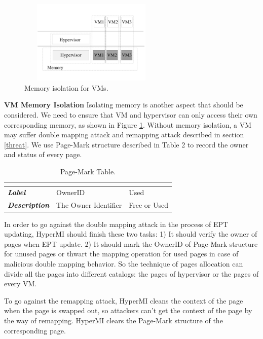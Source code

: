 \documentclass[conference]{IEEEtran}
\begin{document}
\begin{figure}
\centerline{\includegraphics[width=7cm, height=4cm]{pdfvmcs3.pdf}}%
\caption{Memory isolation for VMs.} \label{fig3}
\end{figure}


\textbf{VM Memory Isolation}
Isolating memory is another aspect that should be considered. We need to ensure that VM and hypervisor can only access their own corresponding memory, as shown in Figure \ref{fig3}.
Without memory isolation, a VM may suffer double mapping attack and remapping attack described in section \ref{threat}. We use Page-Mark structure described in Table 2 to record the owner and status of every page. 

\begin{table}
\centering
\caption{Page-Mark Table.}\label{tab2}
\begin{tabular}{p{1.2cm}|p{1.4cm}|p{1.5cm}}
\hline
\multicolumn{3}{c}{\bfseries\textbf\centering{Page-Mark Table}}\\
\hline
{\itshape\bfseries Label} & OwnerID & Used \\
\hline
{\itshape\bfseries Description} & The Owner Identifier & Free or Used \\
\hline
\end{tabular}
\end{table}

In order to go against the double mapping attack in the process of EPT updating, HyperMI should finish these two tasks: 1) It should verify the owner of pages when EPT update. 2) It should mark the OwnerID of Page-Mark structure for unused pages or thwart the mapping operation for used pages in case of malicious double mapping behavior. So the technique of pages allocation can divide all the pages into different catalogs: the pages of hypervisor or the pages of every VM.

To go against the remapping attack, HyperMI cleans the context of the page when the page is swapped out, so attackers can't get the context of the page by the way of remapping. HyperMI clears the Page-Mark structure of the corresponding page. 
\end{document}
